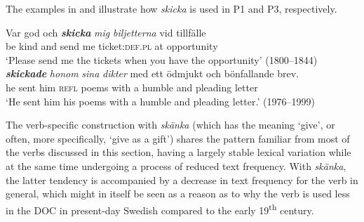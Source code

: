 \documentclass[output=paper]{langscibook}
\begin{document}
\begin{table}
\caption{Frequency measures of the verb-specific DOC with \textit{skicka} ‘send’}
\label{tab:valdeson:19}
\end{table}

The examples in  and  illustrate how \textit{skicka} is used in P1 and P3, respectively.


\ea \label{ex:valdeson:30}
\gll Var   god     och \textbf{\textit{skicka}} \textit{mig} \textit{biljetterna} {vid} {tillfälle}\\
  be        kind    and  send       me   ticket:\textsc{def.pl} at       opportunity\\
\glt `Please send me the tickets when you have the opportunity’ (1800–1844)
\ex \label{ex:valdeson:31}
 \textbf{\textit{skickade}} \textit{honom} \textit{sina} \textit{dikter} med     ett   ödmjukt och bönfallande   brev.\\
  he     sent         him       \textsc{refl}   poems with     a         humble   and pleading     letter\\
\glt `He sent him his poems with a humble and pleading letter.’ (1976–1999)
\z


\label{sec:valdeson:5.3.3.7}\largerpage
The verb-specific construction with \textit{skänka} (which has the meaning ‘give’, or often, more specifically, ‘give as a gift’) shares the pattern familiar from most of the verbs discussed in this section, having a largely stable lexical variation while at the same time undergoing a process of reduced text frequency. With \textit{skänka}, the latter tendency is accompanied by a decrease in text frequency for the verb in general, which might in itself be seen as a reason as to why the verb is used less in the DOC in present-day Swedish compared to the early 19\textsuperscript{th} century.
\end{document}
